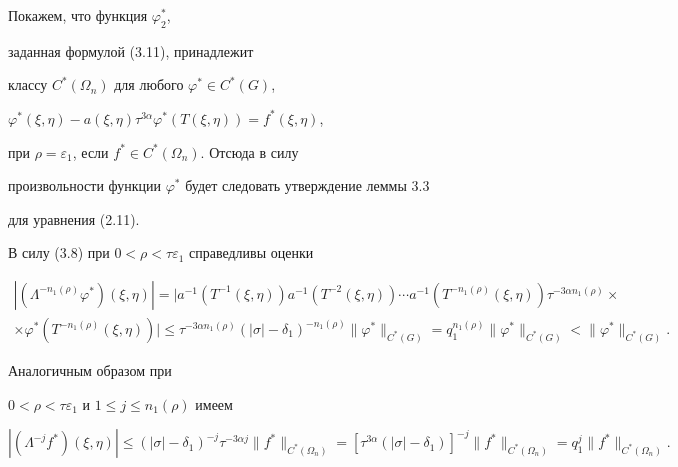 \begin{pf}
Покажем, что функция $\varphi^*_2$,


заданная формулой (3.11), принадлежит


классу $C^*(\Omega_n)$ для любого $\varphi^*\in C^*(G)$,


$\varphi^*(\xi,\eta)-a(\xi,\eta)\tau^{3\alpha}\varphi^*(T(\xi,\eta))=


f^*(\xi,\eta)$,


при $\rho=\varepsilon_1$, если $f^*\in C^*(\Omega_n)$. Отсюда в силу


произвольности функции $\varphi^*$ будет следовать утверждение леммы 3.3


для уравнения (2.11).





В силу (3.8) при $0<\rho<\tau\varepsilon_1$ справедливы оценки


\begin{multline}


|(\Lambda^{-n_1(\rho)}\varphi^*)(\xi,\eta)|=


|a^{-1}(T^{-1}(\xi,\eta))a^{-1}(T^{-2}(\xi,\eta))\dotsb


a^{-1}(T^{-n_1(\rho)}(\xi,\eta))


\tau^{-3\alpha n_1(\rho)}\times \\


%


\times \varphi^*(T^{-n_1(\rho)}(\xi,\eta))|\le


\tau^{-3\alpha n_1(\rho)}(|\sigma|-\delta_1)^{-n_1(\rho)}


\|\varphi^*\|_{C^*(G)}=q^{n_1(\rho)}_1\|\varphi^*\|_{C^*(G)}<


\|\varphi^*\|_{C^*(G)}.


\end{multline}





Аналогичным образом при


$0<\rho<\tau\varepsilon_1$ и $1\le j\le n_1(\rho)$ имеем


$$


|(\Lambda^{-j}f^*)(\xi,\eta)|\le(|\sigma|-\delta_1)^{-j}


\tau^{-3\alpha j}\|f^*\|_{C^*(\Omega_n)}=


[\tau^{3\alpha}(|\sigma|-\delta_1)]^{-j}


\|f^*\|_{C^*(\Omega_n)}=


q^j_1\|f^*\|_{C^*(\Omega_n)}.


$$






\end{pf}
